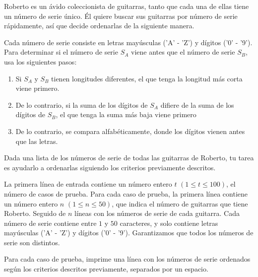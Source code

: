 
Roberto es un ávido coleccionista de guitarras, tanto que cada una de ellas tiene un número de serie único. Él quiere buscar sus guitarras por número de serie rápidamente, así que decide ordenarlas de la siguiente manera.

Cada número de serie consiste en letras mayúsculas ('A' - 'Z') y dígitos ('0' - '9'). Para determinar si el número de serie $S_{A}$ viene antes que el número de serie $S_{B}$, usa los siguientes pasos:

\begin{enumerate}
    \item Si $S_{A}$ y $S_{B}$ tienen longitudes diferentes, el que tenga la longitud más corta viene primero.
    \item De lo contrario, si la suma de los dígitos de $S_{A}$ difiere de la suma de los dígitos de $S_{B}$, el que tenga la suma más baja viene primero
    \item De lo contrario, se compara alfabéticamente, donde los dígitos vienen antes que las letras.
\end{enumerate}

Dada una lista de los números de serie de todas las guitarras de Roberto, tu tarea es ayudarlo a ordenarlas siguiendo los criterios previamente descritos.


La primera línea de entrada contiene un número entero $t$ $(1 \le t \le 100)$, el número de casos de prueba.
Para cada caso de prueba, la primera línea contiene un número entero $n$ $(1 \leq n \leq 50)$, que indica el número de guitarras que tiene Roberto.
Seguido de $n$ líneas con los números de serie de cada guitarra. Cada número de serie contiene entre $1$ y $50$ caracteres, y solo contiene letras mayúsculas ('A' - 'Z') y dígitos ('0' - '9'). Garantizamos que todos los números de serie son distintos.

\outputText

Para cada caso de prueba, imprime una línea con los números de serie ordenados según los criterios descritos previamente, separados por un espacio.

\exampleCases

\begin{example}
\end{example}
